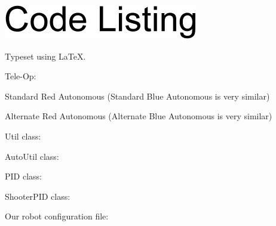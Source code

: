 \documentclass[letterpaper,10pt]{article}
\newcommand{\latex}{\LaTeX}
\begin{document}
\begin{flushleft}

\includegraphics{./CodeListingArial14.png}

\medskip

Typeset using \latex.

\medskip

Tele-Op:



\pagebreak

Standard Red Autonomous (Standard Blue Autonomous is very similar)



\pagebreak

Alternate Red Autonomous (Alternate Blue Autonomous is very similar)



\pagebreak

Util class:



\pagebreak

AutoUtil class:





%

\pagebreak

PID class:



\pagebreak

ShooterPID class:



\pagebreak

Our robot configuration file:



\end{flushleft}
\end{document}
